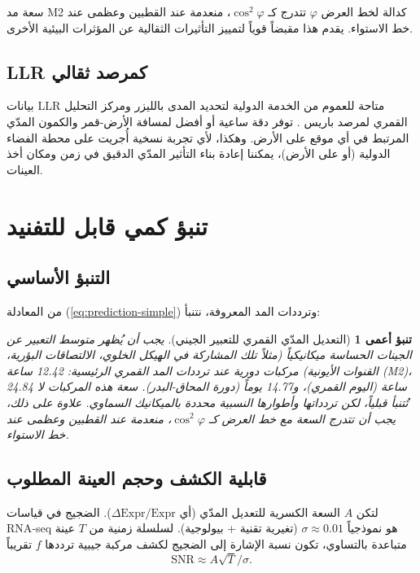 \documentclass[11pt,a4paper]{article}
\newtheorem{prediction}[theorem]{تنبؤ أعمى}
\theoremstyle{remark}
\begin{document}
	سعة مد M2 كدالة لخط العرض \(\varphi\) تتدرج كـ \(\cos^2\varphi\)، منعدمة عند القطبين وعظمى عند خط الاستواء. يقدم هذا مقبضاً قوياً لتمييز التأثيرات الثقالية عن المؤثرات البيئية الأخرى.
	
	\subsection{LLR كمرصد ثقالي}
	
	بيانات LLR متاحة للعموم من الخدمة الدولية لتحديد المدى بالليزر \cite{ILRS} ومركز التحليل القمري لمرصد باريس \cite{LLR-POLAC}. توفر دقة ساعية أو أفضل لمسافة الأرض-قمر والكمون المدّي المرتبط في أي موقع على الأرض. وهكذا، لأي تجربة نسخية أُجريت على محطة الفضاء الدولية (أو على الأرض)، يمكننا إعادة بناء التأثير المدّي الدقيق في زمن ومكان أخذ العينات.
	
	\section{تنبؤ كمي قابل للتفنيد}
	\label{sec:prediction}
	
	\subsection{التنبؤ الأساسي}
	
	من المعادلة (\ref{eq:prediction-simple}) وترددات المد المعروفة، نتنبأ:
	
	\begin{prediction}[التعديل المدّي القمري للتعبير الجيني]
		يجب أن يُظهر متوسط التعبير عن الجينات الحساسة ميكانيكياً (مثلاً تلك المشاركة في الهيكل الخلوي، الالتصاقات البؤرية، القنوات الأيونية) مركبات دورية عند ترددات المد القمري الرئيسية: 12.42 ساعة (M2)، 24.84 ساعة (اليوم القمري)، و14.77 يوماً (دورة المحاق-البدر). سعة هذه المركبات لا تُتنبأ قبلياً، لكن تردداتها وأطوارها النسبية محددة بالميكانيك السماوي. علاوة على ذلك، يجب أن تتدرج السعة مع خط العرض كـ \(\cos^2\varphi\)، منعدمة عند القطبين وعظمى عند خط الاستواء.
	\end{prediction}
	
	\subsection{قابلية الكشف وحجم العينة المطلوب}
	
	لتكن \(A\) السعة الكسرية للتعديل المدّي (أي \(\Delta\text{Expr}/\text{Expr}\)). الضجيج في قياسات RNA‑seq هو نموذجياً \(\sigma \approx 0.01\) (تغيرية تقنية + بيولوجية). لسلسلة زمنية من \(T\) عينة متباعدة بالتساوي، تكون نسبة الإشارة إلى الضجيج لكشف مركبة جيبية ترددها \(f\) تقريباً
	\[
	\mathrm{SNR} \approx A \sqrt{T} / \sigma .
	\]
	
\end{document}
